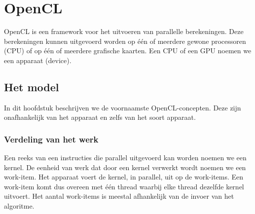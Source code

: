 \chapter{OpenCL}
\label{h:opencl} 
OpenCL is een framework voor het uitvoeren van parallelle berekeningen. Deze berekeningen kunnen uitgevoerd worden op \'e\'en of meerdere gewone processoren (CPU) of op \'e\'en of meerdere grafische kaarten. Een CPU of een GPU noemen we een apparaat (device).

\section{Het model}
In dit hoofdstuk beschrijven we de voornaamste OpenCL-concepten. Deze zijn onafhankelijk van het apparaat en zelfs van het soort apparaat.
\subsection{Verdeling van het werk}
Een reeks van een instructies die parallel uitgevoerd kan worden noemen we een kernel. De eenheid van werk dat door een kernel verwerkt wordt noemen we een work-item. Het apparaat voert de kernel, in parallel, uit op de work-items. Een work-item komt dus overeen met \'e\'en thread waarbij elke thread dezelfde kernel uitvoert. Het aantal work-items is meestal afhankelijk van de invoer van het algoritme.


